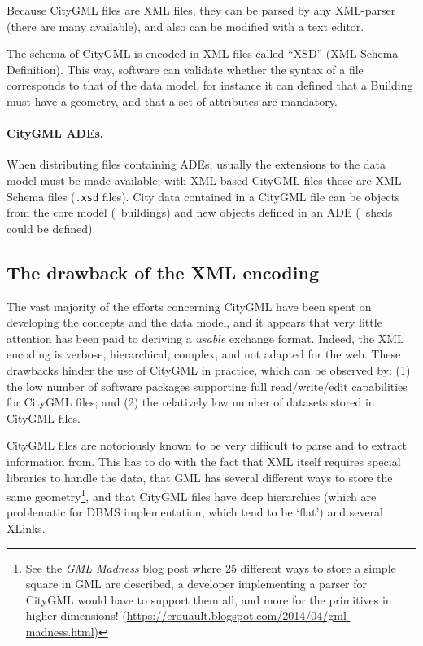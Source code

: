 Because CityGML files are XML files, they can be parsed by any XML-parser (there are many available), and also can be modified with a text editor.

The schema of CityGML is encoded in XML files called ``XSD'' (XML Schema Definition).
This way, software can validate whether the syntax of a file corresponds to that of the data model, for instance it can defined that a Building must have a geometry, and that a set of attributes are mandatory.

\paragraph*{CityGML ADEs.}
When distributing files containing ADEs, usually the extensions to the data model must be made available; with XML-based CityGML files those are XML Schema files (\texttt{.xsd} files).
City data contained in a CityGML file can be objects from the core model (\eg\ buildings) and new objects defined in an ADE (\eg\ sheds could be defined).




\subsection{The drawback of the XML encoding}

The vast majority of the efforts concerning CityGML have been spent on developing the concepts and the data model, and it appears that very little attention has been paid to deriving a \emph{usable} exchange format.
Indeed, the XML encoding is verbose, hierarchical, complex, and not adapted for the web.
These drawbacks hinder the use of CityGML in practice, which can be observed by: (1) the low number of software packages supporting full read/write/edit capabilities for CityGML files; and (2) the relatively low number of datasets stored in CityGML files.

CityGML files are notoriously known to be very difficult to parse and to extract information from.
This has to do with the fact that XML itself requires special libraries to handle the data, that GML has several different ways to store the same geometry\footnote{See the \emph{GML Madness} blog post where 25 different ways to store a simple square in GML are described, a developer implementing a parser for CityGML would have to support them all, and more for the primitives in higher dimensions! (\url{https://erouault.blogspot.com/2014/04/gml-madness.html})}, and that CityGML files have deep hierarchies (which are problematic for DBMS implementation, which tend to be `flat') and several XLinks.



